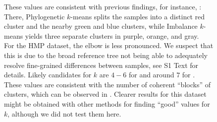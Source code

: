 \begin{figure}[hpbt]
{        These values are consistent with previous findings, for instance, :
        There, Phylogenetic $k$-means splits the samples into a distinct red cluster and the nearby green and blue clusters,
        while Imbalance $k$-means yields three separate clusters in purple, orange, and gray.
        \\
        For the HMP dataset, the elbow is less pronounced.
        We suspect that this is due to the broad reference tree not being able to adequately
        resolve fine-grained differences between samples,
        see S1 Text for details. %
        Likely candidates for $k$ are $4-6$ for 
        and around $7$ for .
        These values are consistent with the number of coherent ``blocks'' of clusters,
        which can be observed in .
        Clearer results for this dataset might be obtained with other methods for finding ``good'' values for $k$,
        although we did not test them here.
    }
    \label{fig:elbows}
\end{figure}
